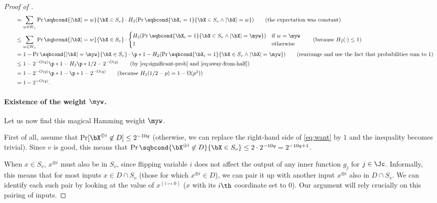 \begin{proof}[Proof of ]
\begin{align*}
&\qquad=\sum_{w \in W_v}\Pr\sqbcond{|\bX|=w}{\bX \in S_v}\cdot H_2(\Pr\sqbcond{\bX_i=1}{\bX \in S_v \wedge|\bX|=w})\tag{the expectation was constant}\\
&\qquad\leq\sum_{w \in W_v}\Pr\sqbcond{|\bX|=w}{\bX \in S_v}\cdot
\begin{cases}
H_2(\Pr\sqbcond{\bX_i=1}{\bX \in S_v \wedge|\bX|=\myw}) & \text{if $w = \myw$}\\
1 & \text{otherwise}
\end{cases}
\tag{because $H_2(\cdot) \leq 1$}\\
&\qquad= 1 - \Pr\sqbcond{|\bX|=\myw}{\bX \in S_v} \cdot\p*{1-H_2(\Pr\sqbcond{\bX_i=1}{\bX \in S_v \wedge|\bX|=\myw})}\tag{rearrange and use the fact that probabilities sum to 1}\\
&\qquad\leq 1 - 2^{-O(q)} \p*{1-H_2\p*{1/2 - 2^{-O(q)}}}\tag{by \eqref{eq:significant-prob} and \eqref{eq:away-from-half}}\\
&\qquad= 1 - 2^{-O(q)} \p*{1 - \p*{1-2^{-O(q)}}}\tag{because $H_2(1/2-p) = 1-\Omega(p^2)$}\\
&\qquad= 1 - 2^{-O(q)}.
\end{align*}

\paragraph*{Existence of the weight $\myw$.} Let us now find this magical Hamming weight $\myw$.

First of all, assume that $\Pr[\bX^{\oplus i} \not\in D] \leq 2^{-10q}$ (otherwise, we can replace the right-hand side of \eqref{eq:want} by $1$ and the inequality becomes trivial).
Since $v$ is good, this means that $\Pr\sqbcond{\bX^{\oplus i} \not\in D}{\bX \in S_v} \leq 2 \cdot 2^{-10q} = 2^{-10q+1}$.

When $x \in S_v$, $x^{\oplus i}$ must also be in $S_v$, since flipping variable $i$ does not affect the output of any inner function $g_j$ for $j \in \Jc$.
Informally, this means that for most inputs $x \in D \cap S_v$ (those for which $x^{\oplus i} \in D$), we can pair it up with another input $x^{\oplus i}$ also in $D \cap S_v$.
We can identify each such pair by looking at the value of $x^{(i \mapsto 0)}$ ($x$ with its $i\th$ coordinate set to $0$).
Our argument will rely crucially on this pairing of inputs.


\end{proof}

